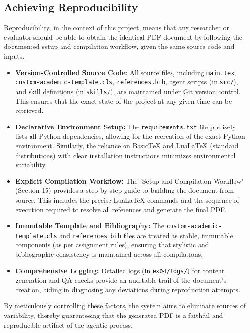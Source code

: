 \documentclass{custom-academic-template}
\begin{document}
\subsection{Achieving Reproducibility}
Reproducibility, in the context of this project, means that any researcher or evaluator should be able to obtain the identical PDF document by following the documented setup and compilation workflow, given the same source code and inputs.
\begin{itemize}
    \item \textbf{Version-Controlled Source Code:} All source files, including \texttt{main.tex}, \texttt{custom-academic-template.cls}, \texttt{references.bib}, agent scripts (in \texttt{src/}), and skill definitions (in \texttt{skills/}), are maintained under Git version control. This ensures that the exact state of the project at any given time can be retrieved.
    \item \textbf{Declarative Environment Setup:} The \texttt{requirements.txt} file precisely lists all Python dependencies, allowing for the recreation of the exact Python environment. Similarly, the reliance on BasicTeX and LuaLaTeX (standard distributions) with clear installation instructions minimizes environmental variability.
    \item \textbf{Explicit Compilation Workflow:} The "Setup and Compilation Workflow" (Section 15) provides a step-by-step guide to building the document from source. This includes the precise LuaLaTeX commands and the sequence of execution required to resolve all references and generate the final PDF.
    \item \textbf{Immutable Template and Bibliography:} The \texttt{custom-academic-template.cls} and \texttt{references.bib} files are treated as stable, immutable components (as per assignment rules), ensuring that stylistic and bibliographic consistency is maintained across all compilations.
    \item \textbf{Comprehensive Logging:} Detailed logs (in \texttt{ex04/logs/}) for content generation and QA checks provide an auditable trail of the document's creation, aiding in diagnosing any deviations during reproduction attempts.
\end{itemize}
By meticulously controlling these factors, the system aims to eliminate sources of variability, thereby guaranteeing that the generated PDF is a faithful and reproducible artifact of the agentic process.
\end{document}
